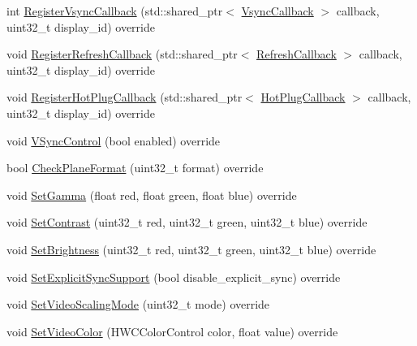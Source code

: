 \begin{DoxyCompactItemize}
\item 
int \mbox{\hyperlink{classhwcomposer_1_1MosaicDisplay_ab95984da914029b9dd2c5fb728926dbc}{Register\+Vsync\+Callback}} (std\+::shared\+\_\+ptr$<$ \mbox{\hyperlink{classhwcomposer_1_1VsyncCallback}{Vsync\+Callback}} $>$ callback, uint32\+\_\+t display\+\_\+id) override
\item 
void \mbox{\hyperlink{classhwcomposer_1_1MosaicDisplay_a1deecbf2ba9b007fa7529b31da47d575}{Register\+Refresh\+Callback}} (std\+::shared\+\_\+ptr$<$ \mbox{\hyperlink{classhwcomposer_1_1RefreshCallback}{Refresh\+Callback}} $>$ callback, uint32\+\_\+t display\+\_\+id) override
\item 
void \mbox{\hyperlink{classhwcomposer_1_1MosaicDisplay_a1d4f419cda4d1729dfb085f385a76afb}{Register\+Hot\+Plug\+Callback}} (std\+::shared\+\_\+ptr$<$ \mbox{\hyperlink{classhwcomposer_1_1HotPlugCallback}{Hot\+Plug\+Callback}} $>$ callback, uint32\+\_\+t display\+\_\+id) override
\item 
void \mbox{\hyperlink{classhwcomposer_1_1MosaicDisplay_a3843cd0fcbd50cfed44d7a0ebdf5539b}{V\+Sync\+Control}} (bool enabled) override
\item 
bool \mbox{\hyperlink{classhwcomposer_1_1MosaicDisplay_a8978685de8d614113e49b3b774c9b723}{Check\+Plane\+Format}} (uint32\+\_\+t format) override
\item 
void \mbox{\hyperlink{classhwcomposer_1_1MosaicDisplay_a99609427012ce9c2e3b4e16ed13211a3}{Set\+Gamma}} (float red, float green, float blue) override
\item 
void \mbox{\hyperlink{classhwcomposer_1_1MosaicDisplay_a6942a0aa562c459a89b014aa15fdcccd}{Set\+Contrast}} (uint32\+\_\+t red, uint32\+\_\+t green, uint32\+\_\+t blue) override
\item 
void \mbox{\hyperlink{classhwcomposer_1_1MosaicDisplay_a113c244569faf509d03062f794216981}{Set\+Brightness}} (uint32\+\_\+t red, uint32\+\_\+t green, uint32\+\_\+t blue) override
\item 
void \mbox{\hyperlink{classhwcomposer_1_1MosaicDisplay_af9053256b801c0334bd89ed7b5e97912}{Set\+Explicit\+Sync\+Support}} (bool disable\+\_\+explicit\+\_\+sync) override
\item 
void \mbox{\hyperlink{classhwcomposer_1_1MosaicDisplay_ac634db4100aa1707f28ff2bbb77b8460}{Set\+Video\+Scaling\+Mode}} (uint32\+\_\+t mode) override
\item 
void \mbox{\hyperlink{classhwcomposer_1_1MosaicDisplay_adba98086d56d0ccc2df7a57a87ddd4b0}{Set\+Video\+Color}} (H\+W\+C\+Color\+Control color, float value) override
\item 

\end{DoxyCompactItemize}
